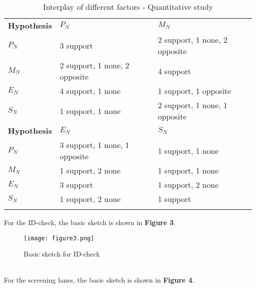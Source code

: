 \documentclass{mcmthesis}
\newlength\savedwidth
\newcommand\whline{\noalign{\global\savedwidth\arrayrulewidth
                            \global\arrayrulewidth 1.2pt}%
                   \hline
                   \noalign{\global\arrayrulewidth\savedwidth}}
\newlength\savewidth
\newcommand\shline{\noalign{\global\savewidth\arrayrulewidth
                            \global\arrayrulewidth 1.2pt}%
                   \hline
                   \noalign{\global\arrayrulewidth\savewidth}}
\begin{document}
\begin{table}[htbp]
	\renewcommand\arraystretch{1.5}
	\footnotesize
	\centering
	\begin{tabular}{m{2.7cm}<{\centering}|m{5cm}<{\centering}|m{5cm}<{\centering}}
		\whline
		\textbf{Hypothesis}&\textbf{$P_N$}&\textbf{$M_N$}\\
		\whline
		\textbf{$P_N$}&3 support &2 support, 1 none, 2 opposite\\

		\textbf{$M_N$}&2 support, 1 none, 2 opposite&4 support\\

		\textbf{$E_N$}&4 support, 1 none&1 support, 1 opposite\\

		\textbf{$S_N$}&1 support, 1 none&2 support, 1 none, 1 opposite\\
		\shline
		\textbf{Hypothesis}&\textbf{$E_N$}&\textbf{$S_N$}\\
		\whline
		\textbf{$P_N$}& 3 support, 1 none, 1 opposite & 1 support, 1 none\\

		\textbf{$M_N$}&1 support, 2 none&1 support, 1 none\\

		\textbf{$E_N$}&3 support&1 support, 2 none\\

		\textbf{$S_N$}&1 support, 2 none&1 support\\
		\shline
	\end{tabular}
	\caption{Interplay of different factors - Quantitative study}\label{tab:Interplay of different factors - Quantitative study}
\end{table}

For the ID-check, the basic sketch is shown in \textbf{Figure 3}.
\begin{figure}[h]
\small
\centering
\texttt{[image: figure3.png]}
\caption{Basic sketch for ID-check} \label{fig:Basic sketch for ID-check}
\end{figure}\\
For the screening lanes, the basic sketch is shown in \textbf{Figure 4}.
\end{document}
